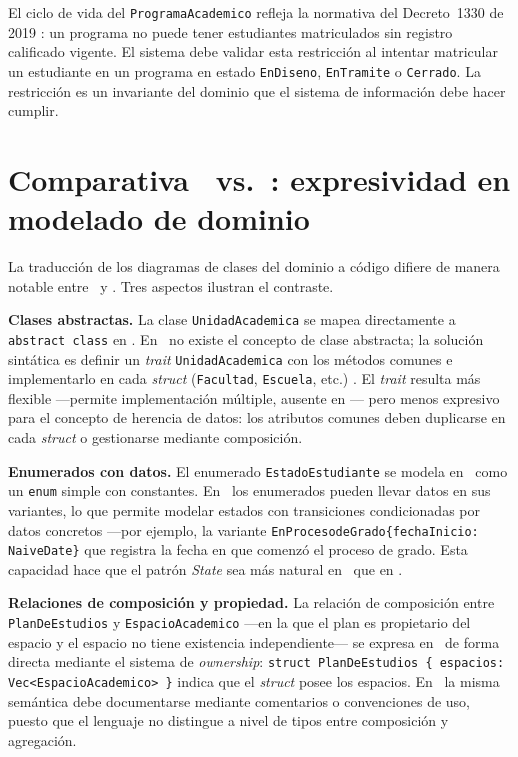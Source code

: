 El ciclo de vida del \texttt{ProgramaAcademico} refleja la normativa del
Decreto~1330 de 2019 \autocite{Decreto1330_2019}: un programa no puede
tener estudiantes matriculados sin registro calificado vigente. El sistema
debe validar esta restricción al intentar matricular un estudiante en un
programa en estado \texttt{EnDiseno}, \texttt{EnTramite} o \texttt{Cerrado}.
La restricción es un invariante del dominio que el sistema de información
debe hacer cumplir.

\section{Comparativa \java\ vs.\ \rust: expresividad en modelado de dominio}
\label{sec:java-rust-uml}

La traducción de los diagramas de clases del dominio a código difiere
de manera notable entre \java\ y \rust. Tres aspectos ilustran el contraste.

\textbf{Clases abstractas.} La clase \texttt{UnidadAcademica} se mapea
directamente a \texttt{abstract class} en \java. En \rust\ no existe
el concepto de clase abstracta; la solución sintática es definir un
\textit{trait} \texttt{UnidadAcademica} con los métodos comunes e implementarlo
en cada \textit{struct} (\texttt{Facultad}, \texttt{Escuela}, etc.)
\autocite{Klabnik2023}. El \textit{trait} resulta más flexible ---permite
implementación múltiple, ausente en \java--- pero menos expresivo para
el concepto de herencia de datos: los atributos comunes deben duplicarse
en cada \textit{struct} o gestionarse mediante composición.

\textbf{Enumerados con datos.} El enumerado \texttt{EstadoEstudiante}
se modela en \java\ como un \texttt{enum} simple con constantes. En \rust\,
los enumerados pueden llevar datos en sus variantes, lo que permite
modelar estados con transiciones condicionadas por datos concretos ---por
ejemplo, la variante \texttt{EnProcesodeGrado\{fechaInicio: NaiveDate\}}
que registra la fecha en que comenzó el proceso de grado. Esta capacidad
hace que el patrón \textit{State} sea más natural en \rust\ que en \java.

\textbf{Relaciones de composición y propiedad.} La relación de composición
entre \texttt{PlanDeEstudios} y \texttt{EspacioAcademico} ---en la que el
plan es propietario del espacio y el espacio no tiene existencia independiente---
se expresa en \rust\ de forma directa mediante el sistema de \textit{ownership}:
\texttt{struct PlanDeEstudios \{ espacios: Vec<EspacioAcademico> \}} indica
que el \textit{struct} posee los espacios. En \java\, la misma semántica
debe documentarse mediante comentarios o convenciones de uso, puesto que
el lenguaje no distingue a nivel de tipos entre composición y agregación.


